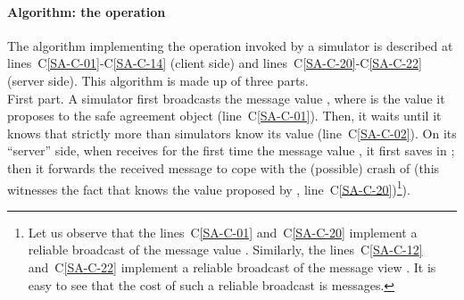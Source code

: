 \documentclass[11pt,letterpaper]{article}
\begin{document}
\paragraph{Algorithm: the operation }
The algorithm implementing the operation  invoked
by a simulator  is described at lines~C\ref{SA-C-01}-C\ref{SA-C-14}
(client side)  and lines~C\ref{SA-C-20}-C\ref{SA-C-22} (server side).
This algorithm is made up of three parts.
\\

First part.
A simulator  first broadcasts the message {\sc value} , where
 is the value it proposes to the safe agreement object
 (line~C\ref{SA-C-01}). Then, it waits until it knows that strictly 
more than 
simulators know its value (line~C\ref{SA-C-02}).
On its ``server'' side, when   receives for the first time
the message {\sc value} , it first saves  in
; then it  forwards  the received message
to cope with the (possible) crash of  (this witnesses the fact that
 knows the value proposed by , line~C\ref{SA-C-20})\footnote{
Let us observe that the lines~C\ref{SA-C-01} and~C\ref{SA-C-20}
implement a reliable broadcast of the  message {\sc value} .
Similarly,  the lines~C\ref{SA-C-12} and~C\ref{SA-C-22}
implement a reliable broadcast of the message {\sc view} .
It is easy to see that the cost of such a reliable broadcast
is  messages.}).
\end{document}

